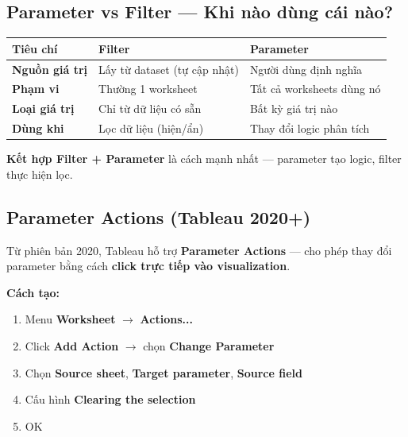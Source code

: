 \documentclass[12pt]{article}
\begin{document}
\subsection{Parameter vs Filter --- Khi nào dùng cái nào?}

\begin{center}
\renewcommand{\arraystretch}{1.4}
\begin{tabularx}{\linewidth}{l X X}
\toprule
\textbf{Tiêu chí} & \textbf{Filter} & \textbf{Parameter} \\
\midrule
\textbf{Nguồn giá trị} & Lấy từ dataset (tự cập nhật) & Người dùng định nghĩa \\
\textbf{Phạm vi} & Thường 1 worksheet & Tất cả worksheets dùng nó \\
\textbf{Loại giá trị} & Chỉ từ dữ liệu có sẵn & Bất kỳ giá trị nào \\
\textbf{Dùng khi} & Lọc dữ liệu (hiện/ẩn) & Thay đổi logic phân tích \\
\bottomrule
\end{tabularx}
\end{center}

\noindent \textbf{Kết hợp Filter + Parameter} là cách mạnh nhất --- parameter tạo logic, filter thực hiện lọc.

\subsection{Parameter Actions (Tableau 2020+)}

\noindent Từ phiên bản 2020, Tableau hỗ trợ \textbf{Parameter Actions} --- cho phép thay đổi parameter bằng cách \textbf{click trực tiếp vào visualization}.

\noindent \textbf{Cách tạo:}

\begin{enumerate}[nosep]
    \item Menu \textbf{Worksheet} $\rightarrow$ \textbf{Actions...}
    \item Click \textbf{Add Action} $\rightarrow$ chọn \textbf{Change Parameter}
    \item Chọn \textbf{Source sheet}, \textbf{Target parameter}, \textbf{Source field}
    \item Cấu hình \textbf{Clearing the selection}
    \item OK
\end{enumerate}

\newpage
\end{document}
